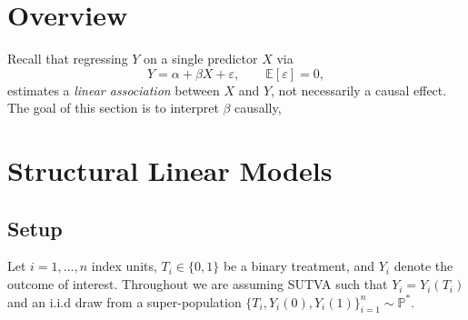 \documentclass[11pt]{exam}
\theoremstyle{plain}
\newcommand{\E}{\mathbb{E}}
\begin{document}

\begingroup\small

\section{Overview}
Recall that regressing $Y$ on a single predictor $X$ via
\[
Y = \alpha + \beta X + \varepsilon, \qquad \E[\varepsilon]=0,
\]
estimates a \emph{linear association} between $X$ and $Y$, not necessarily a causal effect. The goal of this section is to interpret $\beta$ causally,

\section{Structural Linear Models}
\subsection{Setup}
Let $i=1,\ldots,n$ index units, $T_i\in\{0,1\}$ be a binary treatment, and $Y_i$ denote the outcome of interest. Throughout we are assuming SUTVA such that $Y_i = Y_i(T_i)$ and an i.i.d draw from a super-population $\{T_i, Y_i(0), Y_i(1)\}_{i=1}^n \sim \mathbb{P}^\ast$.

\end{document}
